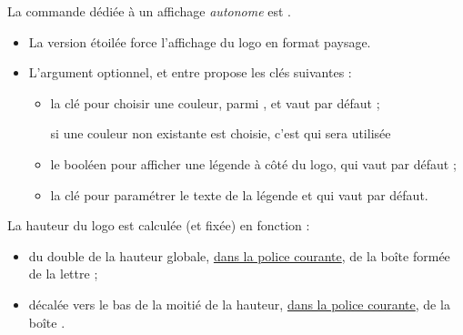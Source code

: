 \documentclass[french,11pt,a4paper]{article}
\begin{document}
La commande dédiée à un affichage \textit{autonome} est .

\medskip

\begin{itemize}[leftmargin=*]
	\item La version étoilée force l'affichage du logo en format paysage.
	\item L'argument optionnel, et entre \MontreCode{[...]} propose les clés suivantes :
	\begin{itemize}
		\item la clé  pour choisir une couleur, parmi , et vaut  par défaut ;
		
		\hfill{\footnotesize si une couleur non existante est choisie, c'est  qui sera utilisée}
		\item le booléen  pour afficher une légende à côté du logo, qui vaut  par défaut ;
		\item la clé  pour paramétrer le texte de la légende et qui vaut  par défaut.
	\end{itemize}
\end{itemize}

\medskip

La hauteur du logo est calculée (et fixée) en fonction :

\begin{itemize}
	\item du double de la hauteur globale, \underline{dans la police courante}, de la boîte formée de la lettre  ;
	\item décalée vers le bas de la moitié de la hauteur, \underline{dans la police courante}, de la boîte .
\end{itemize}
\end{document}
